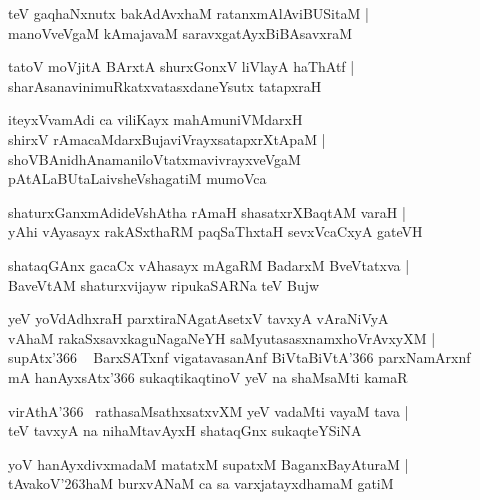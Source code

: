\documentclass[twoside,12pt,openright]{book}
\def\S{\char'263}
\newcounter{shloka}[chapter]
\begin{document}
\begin{shloka}%
teV gaqhaNxnutx bakAdAvxhaM ratanxmAlAviBUSitaM |\\
manoVveVgaM kAmajavaM saravxgatAyxBiBAsavxraM 
\end{shloka}

\begin{shloka}%
tatoV moVjitA BArxtA shurxGonxV liVlayA haThAtf |\\
sharAsanavinimuRkatxvatasxdaneYsutx tatapxraH 
\end{shloka}

\begin{shloka}%
iteyxVvamAdi ca viliKayx mahAmuniVMdarxH \\
shirxV rAmacaMdarxBujaviVrayxsatapxrXtApaM |\\
shoVBAnidhAnamaniloVtatxmavivrayxveVgaM \\
pAtALaBUtaLaivsheVshagatiM mumoVca
\end{shloka}

\begin{shloka}%
shaturxGanxmAdideVshAtha rAmaH shasatxrXBaqtAM varaH |\\
yAhi vAyasayx rakASxthaRM paqSaThxtaH sevxVcaCxyA gateVH
\end{shloka}

\begin{shloka}%
shataqGAnx gacaCx vAhasayx mAgaRM BadarxM BveVtatxva |\\
BaveVtAM shaturxvijayw ripukaSARNa teV Bujw
\end{shloka}

\begin{shloka}%
yeV yoVdAdhxraH parxtiraNAgatAsetxV tavxyA vAraNiVyA \\
vAhaM rakaSxsavxkaguNagaNeYH saMyutasasxnamxhoVrAvxyXM |\\
supAtx\char'366 ~ BarxSATxnf vigatavasanAnf BiVtaBiVtA\char'366 parxNamArxnf \\
mA hanAyxsAtx\char'366 sukaqtikaqtinoV yeV na shaMsaMti kamaR 
\end{shloka}

\begin{shloka}%
virAthA\char'366 ~rathasaMsathxsatxvXM yeV vadaMti vayaM tava |\\
teV tavxyA na nihaMtavAyxH shataqGnx sukaqteYSiNA
\end{shloka}

\begin{shloka}%
yoV hanAyxdivxmadaM matatxM supatxM BaganxBayAturaM |\\
tAvakoV\S haM burxvANaM ca sa varxjatayxdhamaM gatiM 
\end{shloka}
\end{document}
